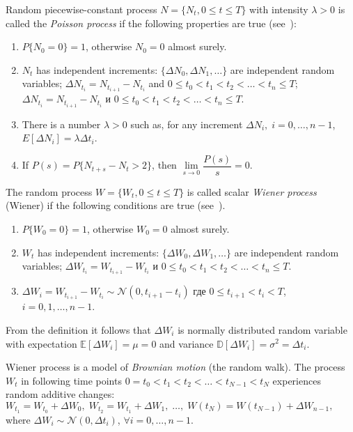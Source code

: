 \documentclass[%
floatfix,
showkeys,
nofootinbib, %
superscriptaddress, %
]{revtex4-1}
\begin{document}
        Random piecewise-constant process
        $N = \{N_{t}, 0 \leqslant t \leqslant T\}$ with intensity
        $\lambda > 0$ is called the \emph{Poisson process} if the
        following properties are true (see~\cite{L_Kloeden_Platen,
          L_Oksendal_en}):
        \begin{enumerate}
                \item $P\{N_0 = 0\} = 1$, otherwise $N_0 = 0$ almost surely.
                \item $N_t$ has independent increments: $\{\Delta N_{0}, \Delta N_{1}, \ldots\}$ are independent random variables; $\Delta N_{t_i} = N_{t_{i+1}} - N_{t_{i}}$ and $0 \leqslant t_{0} < t_{1} < t_{2} < \ldots  < t_{n} \leqslant T$; $\Delta N_{t_i} = N_{t_{i+1}} - N_{t_{i}}$ и $0 \leqslant t_{0} < t_{1} < t_{2} < \ldots  < t_{n} \leqslant T$.
                \item There is a number $\lambda > 0$ such as, for any increment $\Delta N_{i},\; i = 0, \ldots, n-1$, $ E[\Delta N_{i}]= \lambda \Delta t_{i}$.
                \item If $P(s) = P\{N_{t+s} - N_{t} > 2\}$, then $\lim\limits_{s\to 0} \dfrac{P(s)}{s} = 0$.
        \end{enumerate}


        The random process $W = \{W_t, 0 \leqslant t \leqslant T\}$ is called scalar \textit{Wiener process} (Wiener) if the following conditions are true (see~\cite{L_Kloeden_Platen, L_Oksendal_en}).
        \begin{enumerate}
                \item $P\{W_0 = 0\} = 1$, otherwise $W_0 = 0$ almost surely.
                \item $W_t$ has independent increments: $\{\Delta W_{0}, \Delta W_{1}, \ldots\}$ are independent random variables; $\Delta W_{t_i} = W_{t_{i+1}} - W_{t_{i}}$ и $0 \leqslant t_{0} < t_{1} < t_{2} < \ldots  < t_{n} \leqslant T$.
                \item $\Delta W_{i} = W_{t_{i+1}} - W_{t_{i}} \sim \mathcal{N}(0,t_{i+1}-t_{i})$ где $0\leqslant t_{i+1} < t_{i} < T$, $i=0,1,\ldots,n-1$.
        \end{enumerate}


        From the definition it follows that $\Delta W_{i}$ is normally
        distributed random variable with expectation
        $\mathbb{E}[\Delta W_{i}] = \mu = 0$ and variance
        $\mathbb{D}[\Delta W_{i}] = \sigma^{2} = \Delta t_{i}$.

        Wiener process is a model of \emph{Brownian motion} (the
        random walk). The process $W_t$ in following time points
        $0 = t_{0} < t_{1} < t_{2} < \ldots < t_{N-1} < t_{N}$
        experiences random additive changes:
        $ W_{t_{1}} = W_{t_{0}} + \Delta W_0,\; W_{t_{2}} = W_{t_{1}}
        + \Delta W_1,\; \ldots,\; W(t_{N}) = W(t_{N-1}) + \Delta
        W_{n-1}, $ where
        $\Delta W_{i} \sim \mathcal{N}(0,\Delta t_{i})$,
        $\forall i = 0,\ldots,n-1$.
\end{document}
